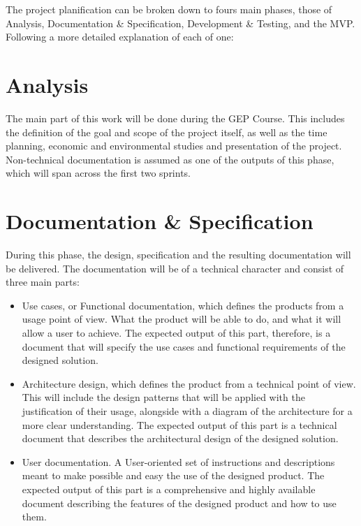 The project planification can be broken down to fours main phases, those of Analysis, Documentation \& Specification, Development \& Testing, and the MVP. Following a more detailed explanation of each of one:

\section{Analysis}
The main part of this work will be done during the GEP Course. This includes the definition of the goal and scope of the project itself, as well as the time planning, economic and environmental studies and presentation of the project. Non-technical documentation is assumed as one of the outputs of this phase, which will span across the first two sprints.

\section{Documentation \& Specification}
During this phase, the design, specification and the resulting documentation will be delivered. The documentation will be of a technical character and consist of three main parts:

\begin{itemize}
\item Use cases, or Functional documentation, which defines the products from a usage point of view. What the product will be able to do, and what it will allow a user to achieve. The expected output of this part, therefore, is a document that will specify the use cases and functional requirements of the designed solution.

\item Architecture design, which defines the product from a technical point of view. This will include the design patterns that will be applied with the justification of their usage, alongside with a diagram of the architecture for a more clear understanding. The expected output of this part is a technical document that describes the architectural design of the designed solution.

\item User documentation. A User-oriented set of instructions and descriptions meant to make possible and easy the use of the designed product. The expected output of this part is a comprehensive and highly available document describing the features of the designed product and how to use them.
\end{itemize}


